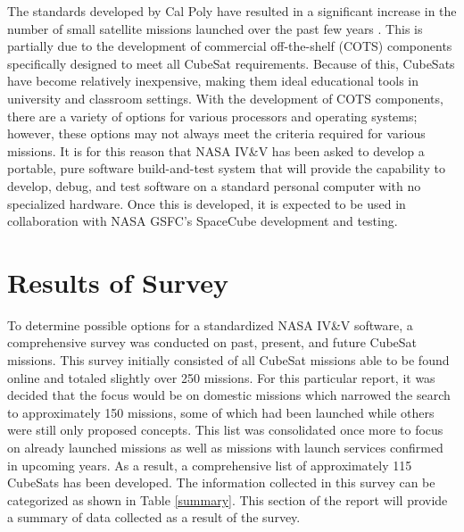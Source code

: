 \documentclass[11pt]{article}
\begin{document}
The standards developed by Cal Poly have resulted in a significant increase in the number of small satellite missions launched over the past few years \cite{MarketAssessment}.  This is partially due to the development of commercial off-the-shelf (COTS) components specifically designed to meet all CubeSat requirements.  Because of this, CubeSats have become relatively inexpensive, making them ideal educational tools in university and classroom settings.  With the development of COTS components, there are a variety of options for various processors and operating systems; however, these options may not always meet the criteria required for various missions.  It is for this reason that NASA IV\&V has been asked to develop a portable, pure software build-and-test system that will provide the capability to develop, debug, and test software on a standard personal computer with no specialized hardware.  Once this is developed, it is expected to be used in collaboration with NASA GSFC's SpaceCube development and testing. 

\section{Results of Survey}
To determine possible options for a standardized NASA IV\&V software, a comprehensive survey was conducted on past, present, and future CubeSat missions.  This survey initially consisted of all CubeSat missions able to be found online and totaled slightly over 250 missions.  For this particular report, it was decided that the focus would be on domestic missions which narrowed the search to approximately 150 missions, some of which had been launched while others were still only proposed concepts.  This list was consolidated once more to focus on already launched missions as well as missions with launch services confirmed in upcoming years.  As a result, a comprehensive list of approximately 115 CubeSats has been developed.  The information collected in this survey can be categorized as shown in Table \ref{summary}.  This section of the report will provide a summary of data collected as a result of the survey.  
\end{document}
